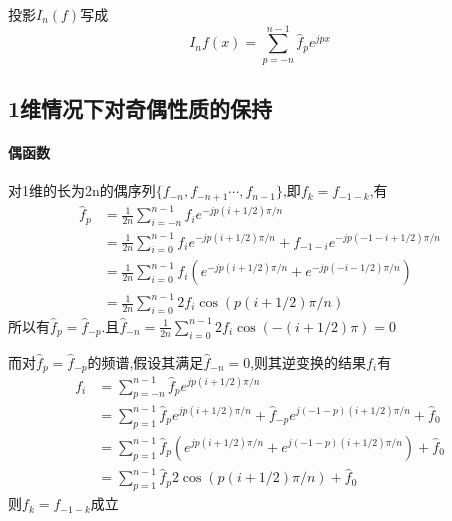 \documentclass[UTF8]{ctexart}
\begin{document}
投影$I_n(f)$写成
$$
I_nf(x) =  \sum\limits_{p=-n}^{n-1}\hat{f}_p e^{jpx}
$$



\subsection{1维情况下对奇偶性质的保持}
\paragraph{偶函数}
对1维的长为2n的偶序列$\{f_{-n},f_{-n+1}\cdots,f_{n-1}\}$,即$f_{k}=f_{-1-k}$,有
\begin{equation*}
  \begin{split}
     \hat{f}_{p}    &= \frac{1}{2n}\sum\limits_{i=-n}^{n-1} f_{i} e^{-jp(i+1/2)\pi/n} \\
                    &= \frac{1}{2n}\sum\limits_{i=0}^{n-1} f_{i} e^{-jp(i+1/2)\pi/n}+f_{-1-i}e^{-jp(-1-i+1/2)\pi/n} \\
                    &= \frac{1}{2n}\sum\limits_{i=0}^{n-1} f_{i} (e^{-jp(i+1/2)\pi/n}+e^{-jp(-i-1/2)\pi/n}) \\
                    &= \frac{1}{2n}\sum\limits_{i=0}^{n-1} 2f_{i} \cos(p(i+1/2)\pi/n)
  \end{split}
\end{equation*}
所以有$\hat{f}_p=\hat{f}_{-p}$.且$\hat{f}_{-n}=\frac{1}{2n}\sum\limits_{i=0}^{n-1} 2f_{i} \cos(-(i+1/2)\pi)=0 $

而对$\hat{f}_p=\hat{f}_{-p}$的频谱,假设其满足$\hat{f}_{-n}=0$,则其逆变换的结果$f_i$有
\begin{equation*}
  \begin{split}
     f_{i}          &= \sum\limits_{p=-n}^{n-1} \hat{f}_{p} e^{jp(i+1/2)\pi/n} \\
                    &= \sum\limits_{p=1}^{n-1} \hat{f}_{p} e^{jp(i+1/2)\pi/n}+\hat{f}_{-p}e^{j(-1-p)(i+1/2)\pi/n} + \hat{f}_{0}  \\
                    &= \sum\limits_{p=1}^{n-1} \hat{f}_{p} (e^{jp(i+1/2)\pi/n}+e^{j(-1-p)(i+1/2)\pi/n}) + \hat{f}_{0}\\
                    &= \sum\limits_{p=1}^{n-1} \hat{f}_{p} 2\cos(p(i+1/2)\pi/n)+ \hat{f}_{0}
  \end{split}
\end{equation*}
则$f_{k}=f_{-1-k}$成立
\end{document}
